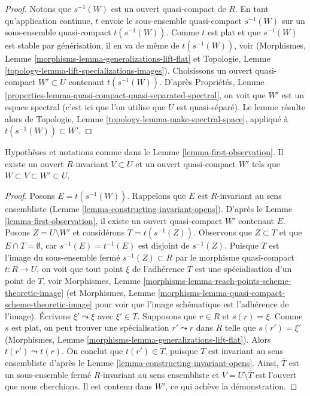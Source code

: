 \begin{proof}
Notons que $s^{-1}(W)$ est un ouvert quasi-compact de $R$.
En tant qu'application continue, $t$ envoie le sous-ensemble quasi-compact
$s^{-1}(W)$ sur un sous-ensemble quasi-compact $t(s^{-1}(W))$.
Comme $t$ est plat et que $s^{-1}(W)$ est stable par générisation,
il en va de même de $t(s^{-1}(W))$, voir
(Morphismes, Lemme \ref{morphisms-lemma-generalizations-lift-flat} et
Topologie, Lemme \ref{topology-lemma-lift-specializations-images}).
Choisissons un ouvert quasi-compact $W' \subset U$ contenant $t(s^{-1}(W))$. D'après
Propriétés, Lemme \ref{properties-lemma-quasi-compact-quasi-separated-spectral},
on voit que $W'$ est un espace spectral (c'est ici que l'on utilise que $U$ est quasi-séparé).
Le lemme résulte alors de
Topologie, Lemme \ref{topology-lemma-make-spectral-space},
appliqué à $t(s^{-1}(W)) \subset W'$.
\end{proof}

\begin{lemma}
\label{lemma-second-observation}
Hypothèses et notations comme dans le Lemme \ref{lemma-first-observation}.
Il existe un ouvert $R$-invariant $V \subset U$ et un ouvert quasi-compact
$W'$ tels que $W \subset V \subset W' \subset U$.
\end{lemma}

\begin{proof}
Posons $E = t(s^{-1}(W))$. Rappelons que $E$ est $R$-invariant au sens ensembliste
(Lemme \ref{lemma-constructing-invariant-opens}).
D'après le Lemme \ref{lemma-first-observation}, il existe un ouvert quasi-compact
$W'$ contenant $E$. Posons $Z = U \setminus W'$ et considérons
$T = t(s^{-1}(Z))$. Observons que $Z \subset T$ et que
$E \cap T = \emptyset$, car $s^{-1}(E) = t^{-1}(E)$ est disjoint
de $s^{-1}(Z)$. Puisque $T$ est l'image du sous-ensemble fermé
$s^{-1}(Z) \subset R$ par le morphisme quasi-compact $t : R \to U$,
on voit que tout point $\xi$ de l'adhérence $\overline{T}$
est une spécialisation d'un point de $T$, voir
Morphismes, Lemme \ref{morphisms-lemma-reach-points-scheme-theoretic-image} (et
Morphismes, Lemme \ref{morphisms-lemma-quasi-compact-scheme-theoretic-image}
pour voir que l'image schématique est l'adhérence de l'image).
Écrivons $\xi' \leadsto \xi$ avec $\xi' \in T$. Supposons que $r \in R$ et
$s(r) = \xi$. Comme $s$ est plat, on peut trouver une spécialisation $r' \leadsto r$
dans $R$ telle que $s(r') = \xi'$
(Morphismes, Lemme \ref{morphisms-lemma-generalizations-lift-flat}).
Alors $t(r') \leadsto t(r)$. On conclut que $t(r') \in T$, puisque $T$
est invariant au sens ensembliste d'après
le Lemme \ref{lemma-constructing-invariant-opens}.
Ainsi, $\overline{T}$ est un sous-ensemble fermé $R$-invariant au sens ensembliste
et $V = U \setminus \overline{T}$ est l'ouvert que nous
cherchions. Il est contenu dans $W'$, ce qui achève la démonstration.
\end{proof}





